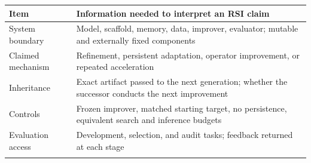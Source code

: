 \documentclass[11pt,american,]{article}
\begin{document}
\begin{longtable}[]{@{}ll@{}}
\toprule
\begin{minipage}[b]{0.47\columnwidth}\raggedright
Item\strut
\end{minipage} & \begin{minipage}[b]{0.47\columnwidth}\raggedright
Information needed to interpret an RSI claim\strut
\end{minipage}\tabularnewline
\midrule
\endhead
\begin{minipage}[t]{0.47\columnwidth}\raggedright
System boundary\strut
\end{minipage} & \begin{minipage}[t]{0.47\columnwidth}\raggedright
Model, scaffold, memory, data, improver, evaluator; mutable and
externally fixed components\strut
\end{minipage}\tabularnewline
\begin{minipage}[t]{0.47\columnwidth}\raggedright
Claimed mechanism\strut
\end{minipage} & \begin{minipage}[t]{0.47\columnwidth}\raggedright
Refinement, persistent adaptation, operator improvement, or repeated
acceleration\strut
\end{minipage}\tabularnewline
\begin{minipage}[t]{0.47\columnwidth}\raggedright
Inheritance\strut
\end{minipage} & \begin{minipage}[t]{0.47\columnwidth}\raggedright
Exact artifact passed to the next generation; whether the successor
conducts the next improvement\strut
\end{minipage}\tabularnewline
\begin{minipage}[t]{0.47\columnwidth}\raggedright
Controls\strut
\end{minipage} & \begin{minipage}[t]{0.47\columnwidth}\raggedright
Frozen improver, matched starting target, no persistence, equivalent
search and inference budgets\strut
\end{minipage}\tabularnewline
\begin{minipage}[t]{0.47\columnwidth}\raggedright
Evaluation access\strut
\end{minipage} & \begin{minipage}[t]{0.47\columnwidth}\raggedright
Development, selection, and audit tasks; feedback returned at each
stage\strut
\end{minipage}\tabularnewline
\begin{minipage}[t]{0.47\columnwidth}\raggedright

\end{minipage}
\end{longtable}
\end{document}

